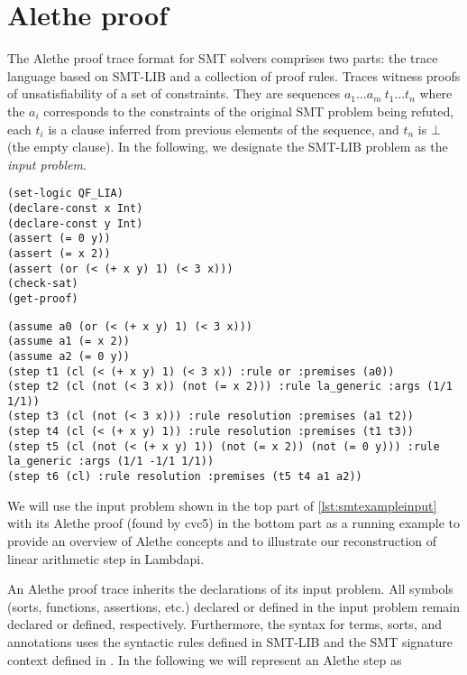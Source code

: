 \section{Alethe proof}
\label{sect:alethe}

The Alethe proof trace format \cite{alethespec} for SMT solvers comprises two parts: the trace language based on SMT-LIB and a collection of proof rules. Traces witness proofs of unsatisfiability of a set of constraints.
They are sequences $a_1 \dots a_m~t_1 \dots t_n$ where
the $a_i$ corresponds to the constraints of the original SMT problem being refuted, each $t_i$ is a clause inferred from previous elements of the sequence, and $t_n$ is $\bot$ (the empty clause).
In the following, we designate the SMT-LIB problem as the \emph{input problem}.

\begin{lstlisting}[language=SMT,label={lst:smtexampleinput}]
(set-logic QF_LIA)
(declare-const x Int)
(declare-const y Int)
(assert (= 0 y))
(assert (= x 2))
(assert (or (< (+ x y) 1) (< 3 x)))
(check-sat)
(get-proof)
\end{lstlisting}

\begin{center}
\lightning
\end{center}

\begin{lstlisting}[language=SMT,caption={The following example is the proof for the unsatisfiability of $(x+y < 1) \lor (3<x), x = 2$ and $0 = y$.},label={lst:smtexampleproof}]
(assume a0 (or (< (+ x y) 1) (< 3 x)))
(assume a1 (= x 2))
(assume a2 (= 0 y))
(step t1 (cl (< (+ x y) 1) (< 3 x)) :rule or :premises (a0))
(step t2 (cl (not (< 3 x)) (not (= x 2))) :rule la_generic :args (1/1 1/1))
(step t3 (cl (not (< 3 x))) :rule resolution :premises (a1 t2))
(step t4 (cl (< (+ x y) 1)) :rule resolution :premises (t1 t3))
(step t5 (cl (not (< (+ x y) 1)) (not (= x 2)) (not (= 0 y))) :rule la_generic :args (1/1 -1/1 1/1))
(step t6 (cl) :rule resolution :premises (t5 t4 a1 a2))
\end{lstlisting}

We will use the input problem shown in the top part of \cref{lst:smtexampleinput} with its Alethe proof (found by cvc5) in the bottom part as a running example to provide an overview of Alethe concepts and to illustrate our reconstruction of linear arithmetic step in Lambdapi.

An Alethe proof trace inherits the declarations of its input problem. All symbols (sorts, functions, assertions, etc.) declared or defined in the input problem remain declared or defined, respectively. Furthermore, the syntax for terms, sorts, and annotations uses the syntactic rules defined in SMT-LIB \cite[\S 3]{smtlib} and the SMT signature context defined in \cite[\S 5.1 and \S 5.2]{smtlib}.
In the following we will represent an Alethe step as

